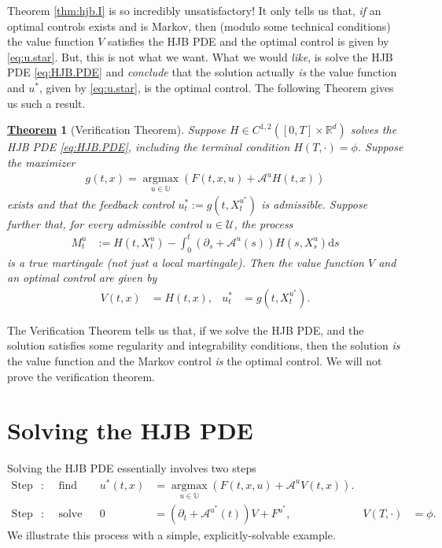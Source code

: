\documentclass[12pt]{book}
\let\varphi\phi
\numberwithin{equation}{chapter}
\theoremstyle{plain}
\newtheorem{theorem}{\underline{Theorem}}
\numberwithin{theorem}{section}
\theoremstyle{definition}
\numberwithin{exercise}{chapter}
\newcommand{\<}{\langle}
\renewcommand{\>}{\rangle}
\renewcommand{\(}{\left(}
\renewcommand{\)}{\right)}
\renewcommand{\[}{\left[}
\renewcommand{\]}{\right]}
\newcommand\Rb{\mathds{R}}
\newcommand\Ub{\mathds{U}}
\newcommand\Ac{\mathscr{A}}
\newcommand\Uc{\mathscr{U}}
\renewcommand\d{\partial}
\newcommand\dd{\mathrm{d}}
\begin{document}
\noindent
Theorem \ref{thm:hjb.I} is so incredibly unsatisfactory!  It only tells us that, \textit{if} an optimal controls exists and is Markov, then (modulo some technical conditions) the value function $V$ satisfies the HJB PDE and the optimal control is given by \eqref{eq:u.star}.  But, this is not what we want.  What we would \textit{like}, is solve the HJB PDE \eqref{eq:HJB.PDE} and \textit{conclude} that the solution actually \emph{is} the value function and $u^*$, given by \eqref{eq:u.star}, is the optimal control.  The following Theorem gives us such a result.

\begin{theorem}[Verification Theorem]
Suppose $H \in C^{1,2}([0,T] \times \Rb^d)$ solves the HJB PDE \eqref{eq:HJB.PDE}, including the terminal condition $H(T,\cdot) = \varphi$.
Suppose the maximizer
\begin{align}
g(t,x)
	=	\operatorname*{argmax}_{u \in \Ub} \( F(t,x,u) + \Ac^u H(t,x) \)
\end{align}
exists and that the feedback control $u_t^* := g(t,X_t^{u^*})$ is admissible.  Suppose further that, for every admissible control $u \in \Uc$, the process
\begin{align}
M_t^u
	&:=	H(t,X_t^u) - \int_0^t ( \d_s + \Ac^u(s) )H(s,X_s^u) \dd s
\end{align}
is a true martingale (not just a local martingale).  Then the value function $V$ and an optimal control are given by
\begin{align}
V(t,x)
	&=	H(t,x) , &
u_t^*
	&=	g(t,X_t^{u^*}) .
\end{align}
\end{theorem}

\noindent
The Verification Theorem tells us that, if we solve the HJB PDE, and the solution satisfies some regularity and integrability conditions, then the solution \emph{is} the value function and the Markov control \emph{is} the optimal control.  We will not prove the verification theorem.

\section{Solving the HJB PDE}
Solving the HJB PDE essentially involves two steps
\begin{align}
\text{Step 1 (easy part)}:&&
\text{find}&&
u^*(t,x)
	&=	\operatorname*{argmax}_{u \in \Ub} ( F(t,x,u) + \Ac^u V(t,x) ) . \\
\text{Step 2 (hard part)}:&&
\text{solve}&&
0
	&=	( \d_t + \Ac^{u^*}(t) ) V + F^{u^*} , &
V(T,\cdot)
	&=	\varphi .
\end{align}
We illustrate this process with a simple, explicitly-solvable example.
\end{document}
